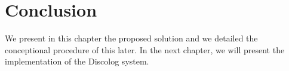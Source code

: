 \section{Conclusion}		
We present in this chapter the proposed solution and we detailed the conceptional procedure of this later. In the next chapter, we will present the implementation of the Discolog system.
%
%
%
%
%
%
%

